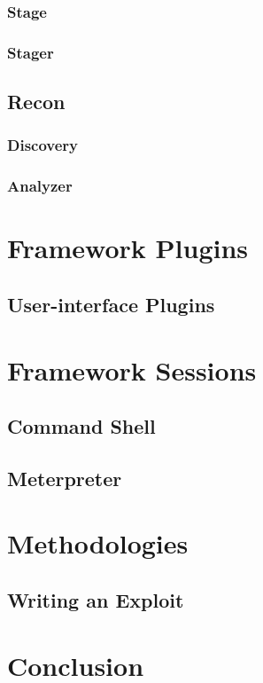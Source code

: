 \documentclass{report}
\begin{document}
        \subsection{Stage}
        \subsection{Stager}
    \section{Recon}
        \subsection{Discovery}
        \subsection{Analyzer}
\chapter{Framework Plugins}
\label{framework-plugins}

    \section{User-interface Plugins}
\chapter{Framework Sessions}
\label{framework-sessions}
    \section{Command Shell}
    \section{Meterpreter}
\chapter{Methodologies}
    \section{Writing an Exploit}
\chapter{Conclusion}
\end{document}
